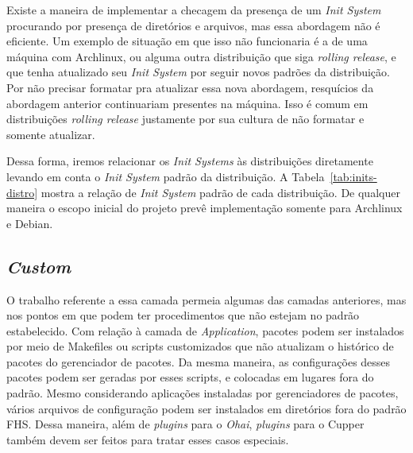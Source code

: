 Existe a maneira de implementar a checagem da presença de um \textit{Init System}
procurando por presença de diretórios e arquivos, mas essa abordagem não é
eficiente. Um exemplo de situação em que isso não funcionaria é a de uma máquina
com Archlinux, ou alguma outra distribuição que siga \textit{rolling release}, e que 
tenha atualizado seu \textit{Init System} por seguir novos padrões da distribuição.
Por não precisar formatar pra atualizar essa nova abordagem, resquícios da abordagem
anterior continuariam presentes na máquina. Isso é comum em distribuições \textit{rolling
release} justamente por sua cultura de não formatar e somente atualizar.

Dessa forma, iremos relacionar os \textit{Init Systems} às distribuições
diretamente levando em conta o \textit{Init System} padrão da distribuição.
A Tabela~\ref{tab:inits-distro} mostra a relação de \textit{Init System} padrão de cada 
distribuição. De qualquer maneira o escopo inicial do projeto prevê
implementação somente para Archlinux e Debian.

\subsection{\textit{Custom}}
\label{sec:camada-custom}

O trabalho referente a essa camada permeia algumas das camadas anteriores, mas
nos pontos em que podem ter procedimentos que não estejam no padrão estabelecido.
Com relação à camada de \textit{Application}, pacotes podem ser instalados por
meio de Makefiles ou scripts customizados que não atualizam o histórico de
pacotes do gerenciador de pacotes. Da mesma maneira, as configurações desses
pacotes podem ser geradas por esses scripts, e colocadas em lugares fora do padrão.
Mesmo considerando aplicações instaladas por gerenciadores de pacotes, vários
arquivos de configuração podem ser instalados em diretórios fora  do padrão FHS.
Dessa maneira, além de \textit{plugins} para o \textit{Ohai}, \textit{plugins}
para o Cupper também devem ser feitos para tratar esses casos especiais.
